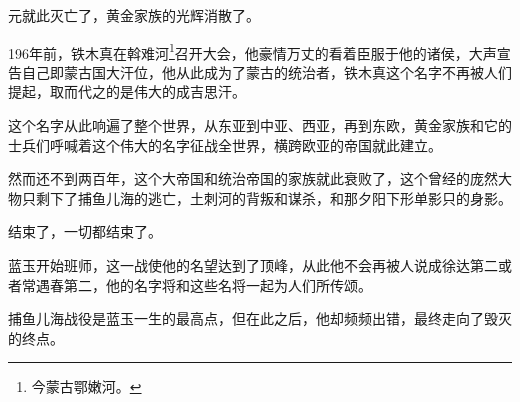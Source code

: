 \begin{multicols}{\theparacolNo}
		元就此灭亡了，黄金家族的光辉消散了。

		196年前，铁木真在斡难河\footnote{今蒙古鄂嫩河。}召开大会，他豪情万丈的看着臣服于他的诸侯，大声宣告自己即蒙古国大汗位，他从此成为了蒙古的统治者，铁木真这个名字不再被人们提起，取而代之的是伟大的成吉思汗。

		这个名字从此响遍了整个世界，从东亚到中亚、西亚，再到东欧，黄金家族和它的士兵们呼喊着这个伟大的名字征战全世界，横跨欧亚的帝国就此建立。

		然而还不到两百年，这个大帝国和统治帝国的家族就此衰败了，这个曾经的庞然大物只剩下了捕鱼儿海的逃亡，土刺河的背叛和谋杀，和那夕阳下形单影只的身影。

		结束了，一切都结束了。

		蓝玉开始班师，这一战使他的名望达到了顶峰，从此他不会再被人说成徐达第二或者常遇春第二，他的名字将和这些名将一起为人们所传颂。

		捕鱼儿海战役是蓝玉一生的最高点，但在此之后，他却频频出错，最终走向了毁灭的终点。
		\ifnum{}
	\end{multicols}
\fi
\newpage
